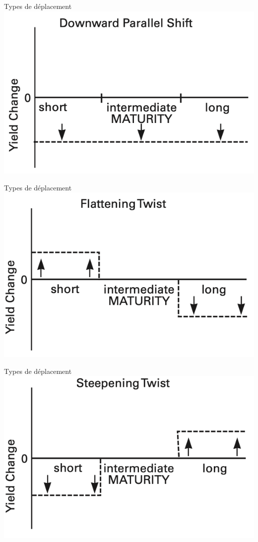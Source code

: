 \documentclass[10pt,a4paper]{beamer}
\begin{document}
\begin{frame}{Types de déplacement}
\includegraphics{2}
\end{frame}

\begin{frame}{Types de déplacement}
\includegraphics{3}
\end{frame}

\begin{frame}{Types de déplacement}
\includegraphics{4}
\end{frame}
\end{document}
